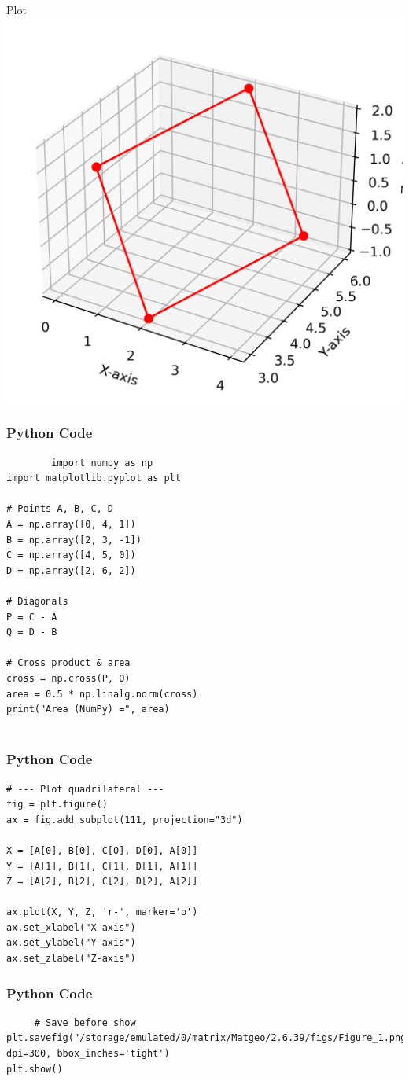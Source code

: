 \documentclass{beamer}
\begin{document}
\begin{frame}{Plot}
    \centering
    \includegraphics[width=\columnwidth, height=0.8\textheight, keepaspectratio]{figs/figure_1.png}     
\end{frame}

\begin{frame}[fragile]
    \frametitle{Python Code}
    \begin{lstlisting}
        import numpy as np
import matplotlib.pyplot as plt

# Points A, B, C, D
A = np.array([0, 4, 1])
B = np.array([2, 3, -1])
C = np.array([4, 5, 0])
D = np.array([2, 6, 2])

# Diagonals
P = C - A
Q = D - B

# Cross product & area
cross = np.cross(P, Q)
area = 0.5 * np.linalg.norm(cross)
print("Area (NumPy) =", area)


    \end{lstlisting}
\end{frame}

\begin{frame}[fragile]
    \frametitle{Python Code}
    \begin{lstlisting}
# --- Plot quadrilateral ---
fig = plt.figure()
ax = fig.add_subplot(111, projection="3d")

X = [A[0], B[0], C[0], D[0], A[0]]
Y = [A[1], B[1], C[1], D[1], A[1]]
Z = [A[2], B[2], C[2], D[2], A[2]]

ax.plot(X, Y, Z, 'r-', marker='o')
ax.set_xlabel("X-axis")
ax.set_ylabel("Y-axis")
ax.set_zlabel("Z-axis")

    \end{lstlisting}
\end{frame}

\begin{frame}[fragile]
    \frametitle{Python Code}
    \begin{lstlisting}
     # Save before show
plt.savefig("/storage/emulated/0/matrix/Matgeo/2.6.39/figs/Figure_1.png", dpi=300, bbox_inches='tight')
plt.show()   
    \end{lstlisting}
    
\end{frame}
\end{document}
